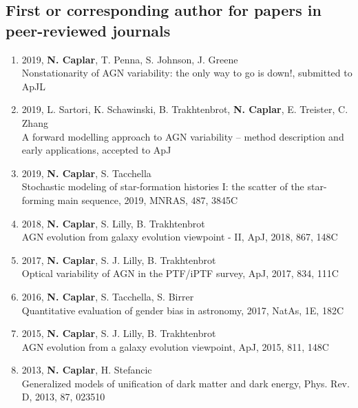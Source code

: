 \documentclass[11pt,letterpaper]{article}
\begin{document}

\subsection*{First or corresponding author for papers in  peer-reviewed journals}

\begin{enumerate}

\item 2019, \textbf{N. Caplar}, T. Penna, S. Johnson, J. Greene \\
Nonstationarity of AGN variability: the only way to go is down!, submitted to ApJL

\item 2019, L. Sartori, K. Schawinski, B. Trakhtenbrot, \textbf{N. Caplar}, E. Treister, C. Zhang\\
A forward modelling approach to AGN variability – method
description and early applications, accepted to ApJ

\item 2019, \textbf{N. Caplar}, S. Tacchella \\
Stochastic modeling of star-formation histories I: the scatter of the star-forming main sequence, 2019, MNRAS, 487, 3845C

\item 2018, \textbf{N. Caplar}, S. Lilly, B. Trakhtenbrot\\
AGN evolution from galaxy evolution viewpoint - II, ApJ, 2018, 867, 148C

\item 2017,  \textbf{N. Caplar}, S. J. Lilly, B. Trakhtenbrot   \\Optical variability of AGN in the PTF/iPTF survey, ApJ, 2017, 834, 111C   

\item 2016, \textbf{N. Caplar}, S. Tacchella, S. Birrer \\ Quantitative evaluation of gender bias in astronomy,  2017, NatAs, 1E, 182C
 
\item 2015,  \textbf{N. Caplar}, S. J. Lilly, B. Trakhtenbrot  \\AGN evolution from a galaxy evolution viewpoint, ApJ,  2015, 811, 148C 
  
 \item 2013,  \textbf{N. Caplar}, H. Stefancic  \\ Generalized models of unification of dark matter and dark energy, Phys. Rev. D, 2013, 87, 023510 
\end{enumerate}
\end{document}
